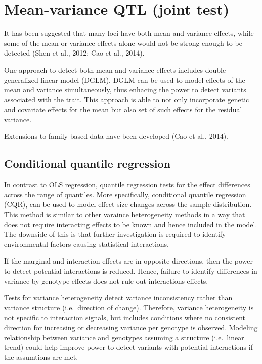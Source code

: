 \documentclass[
]{book}
\begin{document}
\hypertarget{mean-variance-qtl-joint-test}{%
\section{Mean-variance QTL (joint test)}\label{mean-variance-qtl-joint-test}}

It has been suggested that many loci have both mean and variance effects, while some of the mean or variance effects alone would not be strong enough to be detected (Shen et al., 2012; Cao et al., 2014).

One approach to detect both mean and variance effects includes double generalized linear model (DGLM). DGLM can be used to model effects of the mean and variance simultaneously, thus enhacing the power to detect variants associated with the trait. This approach is able to not only incorporate genetic and covariate effects for the mean but also set of such effects for the residual variance.

Extensions to family-based data have been developed (Cao et al., 2014).

\hypertarget{conditional-quantile-regression}{%
\subsection{Conditional quantile regression}\label{conditional-quantile-regression}}

In contrast to OLS regression, quantile regression tests for the effect differences across the range of quantiles. More specifically, conditional quantile regression (CQR), can be used to model effect size changes across the sample distribution. This method is similar to other varaince heterogeneity methods in a way that does not require interacting effects to be known and hence included in the model. The downside of this is that further investigation is required to identify environmental factors causing statistical interactions.

If the marginal and interaction effects are in opposite directions, then the power to detect potential interactions is reduced. Hence, failure to identify differences in variance by genotype effects does not rule out interactions effects.

Tests for variance heterogeneity detect variance inconsistency rather than variance structure (i.e.~direction of change). Therefore, variance heterogeneity is not specific to interaction signals, but includes conditions where no consistent direction for increasing or decreasing variance per genotype is observed. Modeling relationship between variance and genotypes assuming a structure (i.e.~linear trend) could help improve power to detect variants with potential interactions if the assumtions are met.
\end{document}

